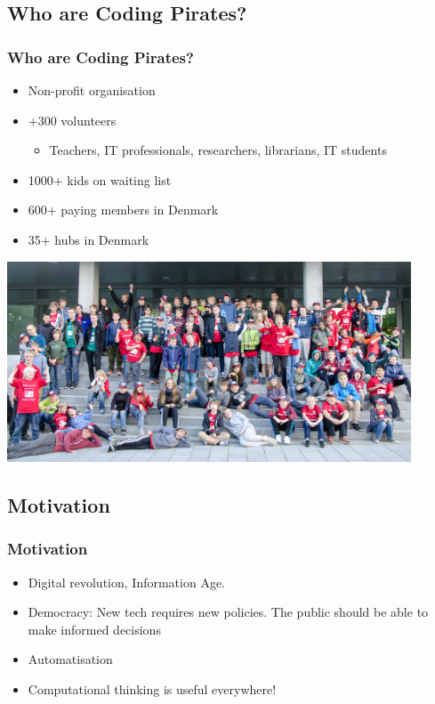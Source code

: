 \documentclass{beamer}
\begin{document}
\subsection{Who are Coding Pirates?}
\begin{frame}
\frametitle{Who are Coding Pirates?}
\begin{itemize}
\item Non-profit organisation
\item +300 volunteers
  \begin{itemize}
  \item Teachers, IT professionals, researchers, librarians, IT students
  \end{itemize}
\item 1000+ kids on waiting list
\item 600+ paying members in Denmark
\item 35+ hubs in Denmark
\end{itemize}

\centerline{\includegraphics[width=0.9\textwidth]{imagery/gamejam}}
\end{frame}

\subsection{Motivation}

\begin{frame}
\frametitle{Motivation}

\begin{itemize}
\item Digital revolution, Information Age.
\item Democracy: New tech requires new policies. The public
  should be able to make informed decisions
\item Automatisation
\item Computational thinking is useful everywhere!
\end{itemize}
\end{frame}
\end{document}
